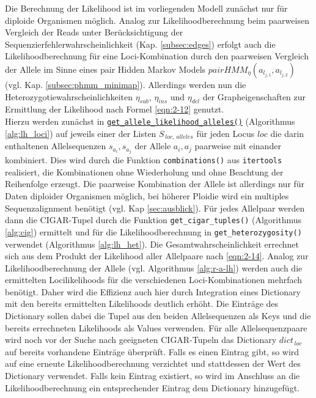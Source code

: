 Die Berechnung der Likelihood ist im vorliegenden Modell zunächst nur für diploide Organismen möglich. Analog zur Likelihoodberechnung beim paarweisen Vergleich der Reads unter Berücksichtigung der Sequenzierfehlerwahrscheinlichkeit (Kap. \ref{subsec:edges}) erfolgt auch die Likelihoodberechnung für eine Loci-Kombination durch den paarweisen Vergleich der Allele im Sinne eines pair Hidden Markov Models $ pairHMM_{\eta}(a_{l_{j,1}}, a_{l_{j,2}}) $ (vgl. Kap. \ref{subsec:phmm_minimap}). Allerdings werden nun die Heterozygotiewahrscheinlichkeiten $\eta_{sub}$, $\eta_{ins}$ und $\eta_{del}$ der Grapheigenschaften zur Ermittlung der Likelihood nach Formel \eqref{eqn:2-12} genutzt.  \\

Hierzu werden zunächst in \hyperref[schritt16]{\lstinline|get_allele_likelihood_alleles()|\label{schritt16txt}} (Algorithmus \ref{alg:lh_loci}) auf jeweils einer der Listen $S_{\,loc,\, alleles}$ für jeden Locus $loc$ die darin enthaltenen Allelsequenzen $s_{a_{i}}, s_{a_{j}}$  der Allele ${a_{i}, a_{j}}$ paarweise mit einander kombiniert. Dies wird durch die Funktion \lstinline|combinations()| aus  \lstinline|itertools| realisiert, die Kombinationen ohne Wiederholung und ohne Beachtung der Reihenfolge erzeugt. Die paarweise Kombination der Allele ist allerdings nur für Daten diploider Organismen möglich, bei höherer Ploidie wird ein multiples Sequenzalignment benötigt (vgl. Kap \ref{sec:ausblick}). Für jedes Allelpaar werden dann die CIGAR-Tupel durch die Funktion \lstinline|get_cigar_tuples()| (Algorithmus \ref{alg:cig}) ermittelt und für die Likelihoodberechnung in \lstinline|get_heterozygosity()| verwendet (Algorithmus \ref{alg:lh_het}). Die Gesamtwahrscheinlichkeit errechnet sich aus dem Produkt der Likelihood aller Allelpaare nach \ref{eqn:2-14}. Analog zur Likelihoodberechnung der Allele (vgl. Algorithmus \ref{alg:r-a-lh}) werden auch die ermittelten Locilikelihoods für die verschiedenen Loci-Kombinationen mehrfach benötigt. Daher wird die Effizienz auch hier durch Integration eines Dictionary mit den bereits ermittelten Likelihoods deutlich erhöht. Die Einträge des Dictionary sollen dabei die Tupel aus den beiden Allelsequenzen als Keys und die bereits errechneten Likelihoods als Values verwenden. Für alle Allelsequenzpaare wird noch vor der Suche nach geeigneten CIGAR-Tupeln das Dictionary $ dict_{\,loc} $ auf bereits vorhandene Einträge überprüft.  Falls es einen Eintrag gibt, so wird auf eine erneute Likelihoodberechnung verzichtet und stattdessen der Wert des Dictionary verwendet. Falls kein Eintrag existiert, so wird im Anschluss an die Likelihoodberechnung ein entsprechender Eintrag dem Dictionary hinzugefügt.

